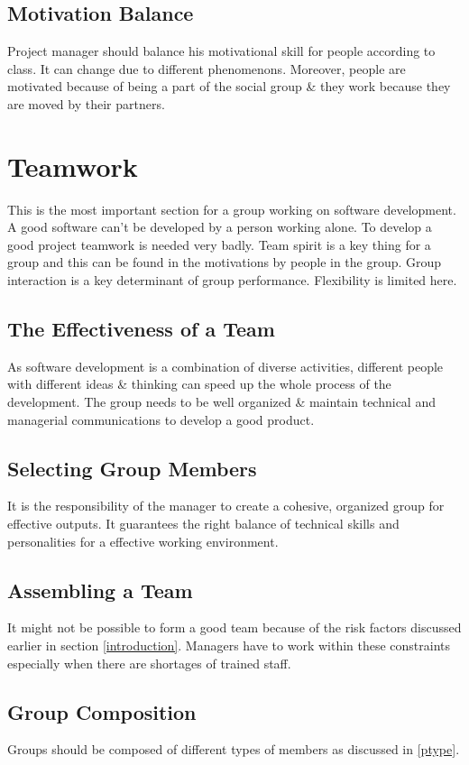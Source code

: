 \documentclass[dvips,12pt]{article}
\begin{document}
\subsection{Motivation Balance}
Project manager should balance his motivational skill for people according to class. It can change due to different phenomenons. Moreover, people are motivated because of being a part of the social group \& they work because they are moved by their partners.

\section{Teamwork}
This is the most important section for a group working on software development. A good software can't be developed by a person working alone. To develop a good project teamwork is needed very badly. Team spirit is a key thing for a group and this can be found in the motivations by people in the group. Group interaction is a key determinant of group performance. Flexibility is limited here.

\subsection{The Effectiveness of a Team}
As software development is a combination of diverse activities, different people with different ideas \& thinking can speed up the whole process of the development. The group needs to be well organized \& maintain technical and managerial communications to develop a good product.

\subsection{Selecting Group Members}
It is the responsibility of the manager to create a cohesive, organized group for effective outputs. It guarantees the right balance of technical skills and personalities for a effective working environment.

\subsection{Assembling a Team}
It might not be possible to form a good team because of the risk factors discussed earlier in section \ref{introduction}. Managers have to work within these constraints especially when there are shortages of trained staff.

\subsection{Group Composition}
Groups should be composed of different types of members as discussed in \ref{ptype}. 
\end{document}
